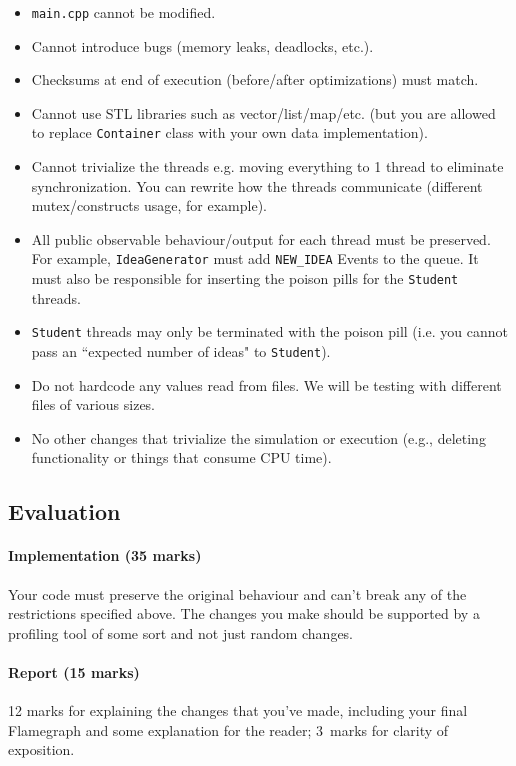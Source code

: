 \documentclass[letterpaper,10pt]{article}
\begin{document}
\begin{itemize}
\item \texttt{main.cpp} cannot be modified.
\item Cannot introduce bugs (memory leaks, deadlocks, etc.).
\item Checksums at end of execution (before/after optimizations) must match.
\item Cannot use STL libraries such as vector/list/map/etc. (but you are allowed to replace \texttt{Container} class with your own data implementation).
\item Cannot trivialize the threads e.g. moving everything to 1 thread to
eliminate synchronization. You can rewrite how the threads
communicate (different mutex/constructs usage, for example).
\item All public observable behaviour/output for each thread must be
preserved. For example, \texttt{IdeaGenerator} must add \texttt{NEW\_IDEA} Events to the queue. It must also be responsible for inserting the poison pills for the \texttt{Student} threads.
\item \texttt{Student} threads may only be terminated with the poison pill (i.e. you cannot pass an ``expected number of ideas" to \texttt{Student}).
\item Do not hardcode any values read from files. We will be testing with different files of various sizes.
\item No other changes that trivialize the simulation or execution (e.g., deleting functionality or things that consume CPU time).
\end{itemize}

\subsection{Evaluation}

\paragraph{Implementation (35 marks)} Your code must preserve the original behaviour and can't break any of the restrictions specified above. The changes you make should be supported by a profiling tool of some sort and not just random changes.

\paragraph{Report (15 marks)} 12 marks for explaining the changes that you've made, including your final Flamegraph and some explanation for the reader; 3~marks for clarity of exposition. 
\end{document}
